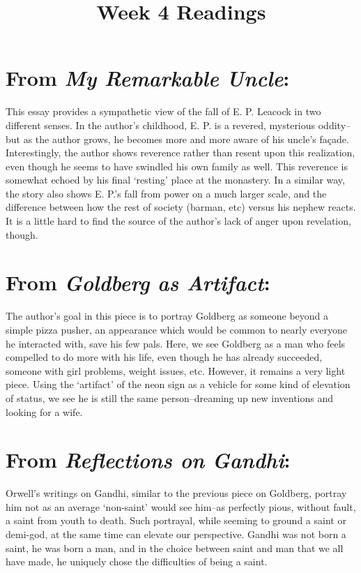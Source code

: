 \documentclass[letterpaper]{article}
\title{Week 4 Readings}
\date{}
\begin{document}
	\maketitle
	\thispagestyle{empty}
	\onehalfspacing
   \section{From \emph{My Remarkable Uncle}:}
   This essay provides a sympathetic view of the fall of E. P. Leacock in two different senses. In the author's childhood, E. P. is a revered, mysterious oddity--but as the author grows, he becomes more and more aware of his uncle's fa\c{c}ade. Interestingly, the author shows reverence rather than resent upon this realization, even though he seems to have swindled his own family as well. This reverence is somewhat echoed by his final `resting' place at the monastery. In a similar way, the story also shows E. P.'s fall from power on a much larger scale, and the difference between how the rest of society (barman, etc) versus his nephew reacts. It is a little hard to find the source of the author's lack of anger upon revelation, though.

   \section{From \emph{Goldberg as Artifact}:}
   The author's goal in this piece is to portray Goldberg as someone beyond a simple pizza pusher, an appearance which would be common to nearly everyone he interacted with, save his few pals. Here, we see Goldberg as a man who feels compelled to do more with his life, even though he has already succeeded, someone with girl problems, weight issues, etc. However, it remains a very light piece. Using the `artifact' of the neon sign as a vehicle for some kind of elevation of status, we see he is still the same person--dreaming up new inventions and looking for a wife.

   \section{From \emph{Reflections on Gandhi}:}
   Orwell's writings on Gandhi, similar to the previous piece on Goldberg, portray him not as an average `non-saint' would see him--as perfectly pious, without fault, a saint from youth to death. Such portrayal, while seeming to ground a saint or demi-god, at the same time can elevate our perspective. Gandhi was not born a saint, he was born a man, and in the choice between saint and man that we all have made, he uniquely chose the difficulties of being a saint.
\end{document}
